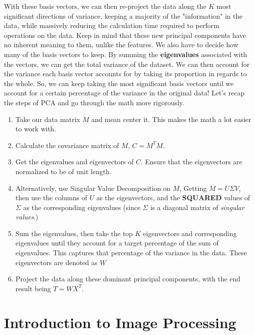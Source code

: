 \documentclass{article}
\begin{document}
With these basis vectors, we can then re-project the data along the $K$ most significant directions of variance, keeping a majority of the "information" in the data, while massively reducing the calculation time required to perform operations on the data. Keep in mind that these new principal components have no inherent meaning to them, unlike the features. We also have to decide how many of the basis vectors to keep. By summing the \textbf{eigenvalues} associated with the vectors, we can get the total variance of the dataset. We can then account for the variance each basis vector accounts for by taking its proportion in regards to the whole. So, we can keep taking the most significant basis vectors until we account for a certain percentage of the variance in the original data! Let's recap the steps of PCA and go through the math more rigorously. 
\begin{enumerate}
    \item Take our data matrix $M$ and mean center it. This makes the math a lot easier to work with.
    \item Calculate the covariance matrix of $M$, $C = M^TM$.
    \item Get the eigenvalues and eigenvectors of $C$. Ensure that the eigenvectors are normalized to be of unit length. 
    \item Alternatively, use Singular Value Decomposition on $M$, Getting $M = U\Sigma V$, then use the columns of $U$ as the eigenvectors, and the \textbf{SQUARED} values of $\Sigma$ as the corresponding eigenvalues (since $\Sigma$ is a diagonal matrix of \textit{singular values}.)
    \item Sum the eigenvalues, then take the top $K$ eigenvectors and corresponding eigenvalues until they account for a target percentage of the sum of eigenvalues. This captures that percentage of the variance in the data. These eigenvectors are denoted as $W$
    \item Project the data along these dominant principal components, with the end result being $T = WX^T$.
\end{enumerate}
\section{Introduction to Image Processing}
\end{document}
